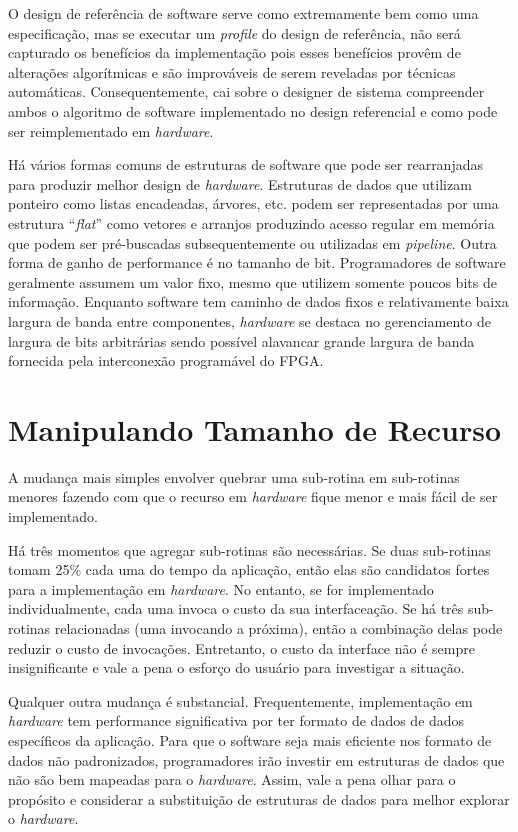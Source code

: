 O design de referência de software serve como extremamente bem como uma especificação, mas se executar um \textit{profile} do design de referência, não será capturado os benefícios da implementação pois esses benefícios provêm de alterações algorítmicas e são improváveis de serem reveladas por técnicas automáticas. Consequentemente, cai sobre o designer de sistema compreender ambos o algoritmo de software implementado no design referencial e como pode ser reimplementado em \textit{hardware}.

Há vários formas comuns de estruturas de software que pode ser rearranjadas para produzir melhor design de \textit{hardware}. Estruturas de dados que utilizam ponteiro como listas encadeadas, árvores, etc. podem ser representadas por uma estrutura ``\textit{flat}'' como vetores e arranjos produzindo acesso regular em memória que podem ser pré-buscadas subsequentemente ou utilizadas em \textit{pipeline}. Outra forma de ganho de performance é no tamanho de bit. Programadores de software geralmente assumem um valor fixo, mesmo que utilizem somente poucos bits de informação. Enquanto software tem caminho de dados fixos e relativamente baixa largura de banda entre componentes, \textit{hardware} se destaca no gerenciamento de largura de bits arbitrárias sendo possível alavancar grande largura de banda fornecida pela interconexão programável do FPGA.

\section{Manipulando Tamanho de Recurso}
A mudança mais simples envolver quebrar uma sub-rotina em sub-rotinas menores fazendo com que o recurso em \textit{hardware} fique menor e mais fácil de ser implementado.

Há três momentos que agregar sub-rotinas são necessárias. Se duas sub-rotinas tomam 25\% cada uma do tempo da aplicação, então elas são candidatos fortes para a implementação em \textit{hardware}. No entanto, se for implementado individualmente, cada uma invoca o custo da sua interfaceação. Se há três sub-rotinas relacionadas (uma invocando a próxima), então a combinação delas pode reduzir o custo de invocações. Entretanto, o custo da interface não é sempre insignificante e vale a pena o esforço do usuário para investigar a situação.

Qualquer outra mudança é substancial. Frequentemente, implementação em \textit{hardware} tem performance significativa por ter formato de dados de dados específicos da aplicação. Para que o software seja mais eficiente nos formato de dados não padronizados, programadores irão investir em estruturas de dados que não são bem mapeadas para o \textit{hardware}. Assim, vale a pena olhar para o propósito e considerar a substituição de estruturas de dados para melhor explorar o \textit{hardware}.
